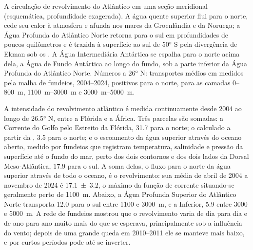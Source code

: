 \begin{omfigure}
{\small A circulação de revolvimento do Atlântico em uma seção meridional
(esquemática, profundidade exagerada). A água quente superior flui para o norte, cede seu calor à
atmosfera e afunda nos mares da Groenlândia e da Noruega; a Água Profunda do Atlântico Norte
retorna para o sul em profundidades de poucos quilômetros e é trazida à superfície ao sul de \ang{50} S pela
divergência de Ekman sob os . A Água Intermediária Antártica se espalha
para o norte acima dela, a Água de Fundo Antártica ao longo do fundo, sob a parte inferior da
Água Profunda do Atlântico Norte. Números a \ang{26} N: transportes médios
em  medidos pela malha de fundeios, 2004--2024, positivos para o norte,
para as camadas 0--\qty{800}{m}, \qtyrange{1100}{3000}{m} e
\qtyrange{3000}{5000}{m}.}
\label{fig:b1:ocean-circulation:moc}
\end{omfigure}

A intensidade do revolvimento atlântico é medida continuamente desde 2004
ao longo de \ang{26.5} N, entre a Flórida e a África. Três parcelas são somadas: a Corrente do
Golfo pelo Estreito da Flórida, \qty{31.7}{\sverdrup} para o norte; o 
calculado a partir da , \qty{3.5}{\sverdrup} para o norte; e o
escoamento da água superior através do oceano aberto, medido por fundeios que registram
temperatura, salinidade e pressão da superfície até o fundo do mar, perto dos dois
contornos e dos dois lados da Dorsal Meso-Atlântica, \qty{17.9}{\sverdrup}
para o sul. A soma delas, o fluxo para o norte da água superior
através de todo o oceano, é o revolvimento: sua média de abril de 2004 a novembro
de 2024 é \qty[uncertainty-mode=separate]{17.1 \pm 3.2}{\sverdrup}, o máximo da
função de corrente situando-se geralmente perto de \qty{1100}{m}. Abaixo, a Água Profunda
Superior do Atlântico Norte transporta \qty{12.0}{\sverdrup} para o sul entre 1100 e \qty{3000}{m}, e a
Inferior, \qty{5.9}{\sverdrup} entre 3000 e \qty{5000}{m}. A rede de fundeios mostrou que o
revolvimento varia de dia para dia e de ano para ano muito mais do que se esperava,
principalmente sob a influência do vento; depois de uma grande queda em 2010--2011 ele se manteve
mais baixo, e por curtos períodos pode até se inverter.

